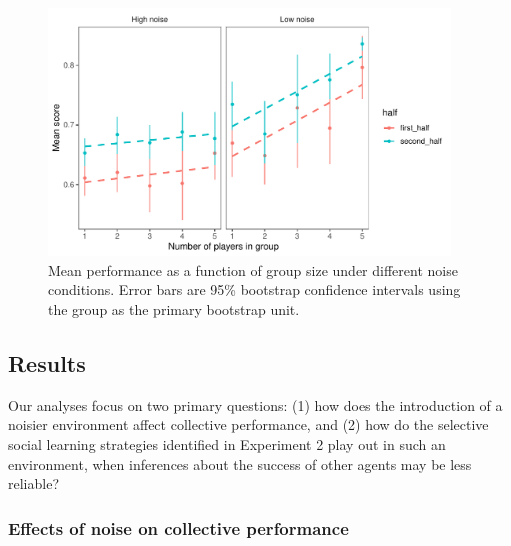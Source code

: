 \documentclass[12pt,letterpaper]{article}
\begin{document}
\begin{figure}[t!]
  \centering
  \includegraphics[width=0.95\textwidth]{./figures/performance-summary}
  \caption{Mean performance as a function of group size under different noise conditions.  Error bars are 95\% bootstrap confidence intervals using the group as the primary bootstrap unit.}
  \label{fig:performance}
\end{figure}

\subsection{Results}

Our analyses focus on two primary questions: (1) how does the introduction of a noisier environment affect collective performance, and (2) how do the selective social learning strategies identified in Experiment 2 play out in such an environment, when inferences about the success of other agents may be less reliable?

\subsubsection{Effects of noise on collective performance}
\end{document}
